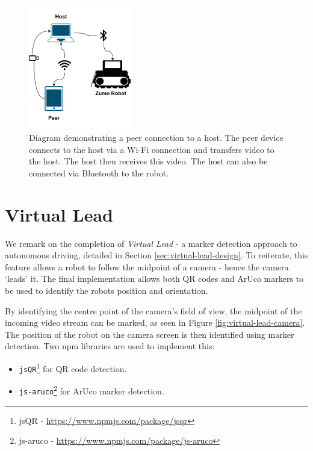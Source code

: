 \documentclass{l4proj}
\begin{document}
\begin{figure}[!ht]
    \centering
    \includegraphics[width=0.4\textwidth]{images/peer-connection.pdf}
    \caption{Diagram demonstrating a peer connection to a host. The peer device connects to the host via a Wi-Fi connection and transfers video to the host. The host then receives this video. The host can also be connected via Bluetooth to the robot.}
    \label{fig:peer-connection}
\end{figure}


\section{Virtual Lead}
We remark on the completion of \textit{Virtual Lead} - a marker detection approach to autonomous driving, detailed in Section \ref{sec:virtual-lead-design}. To reiterate, this feature allows a robot to follow the midpoint of a camera - hence the camera ‘leads’ it. The final implementation allows both QR codes and ArUco markers to be used to identify the robots position and orientation.

By identifying the centre point of the camera's field of view, the midpoint of the incoming video stream can be marked, as seen in Figure \ref{fig:virtual-lead-camera}. The position of the robot on the camera screen is then identified using marker detection. Two npm libraries are used to implement this:
\begin{itemize}
    \item \lstinline{jsQR}\footnote{jsQR - \url{https://www.npmjs.com/package/jsqr}} for QR code detection.
    \item \lstinline{js-aruco}\footnote{js-aruco - \url{https://www.npmjs.com/package/js-aruco}} for ArUco marker detection.
\end{itemize}
\end{document}
